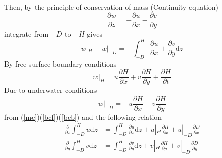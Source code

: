 \documentclass[10pt,a4paper]{article}
\newcommand{\td}{\mbox{d}}
\begin{document}
Then, by the principle of conservation of mass (Continuity equation)
\begin{equation*}
	\frac{\partial w}{\partial z}  = -\frac{\partial u}{\partial x} - \frac{\partial v}{\partial y}
\end{equation*}
integrate from $-D$ to $-H$ gives
\begin{equation}\label{mc}
	w|_H - w|_{-D}  = -\int_{-D}^{H}\frac{\partial u}{\partial x} + \frac{\partial v}{\partial y} \td z
\end{equation}
By free surface boundary conditions
\begin{equation}\label{bcf}
	w|_H  = u\frac{\partial H}{\partial x} + v\frac{\partial H}{\partial y} + \frac{\partial H}{\partial t}
\end{equation}
Due to underwater conditions
\begin{equation}\label{bcb}
	w|_{-D}  = -u\frac{\partial H}{\partial x} - v\frac{\partial H}{\partial y}
\end{equation}
from (\ref{mc})(\ref{bcf})(\ref{bcb}) and the following relation
\begin{equation*}
	\begin{aligned}
		\frac{\partial}{\partial x}\int_{-D}^{H}u\td z &= \int_{-D}^{H}\frac{\partial u}{\partial x}\td z + u|_H\frac{\partial H}{\partial x} + u|_{-D}\frac{\partial D}{\partial x}\\
		\frac{\partial}{\partial y}\int_{-D}^{H}v\td z &= \int_{-D}^{H}\frac{\partial v}{\partial y}\td z + v|_H\frac{\partial H}{\partial y} + v|_{-D}\frac{\partial D}{\partial y}
	\end{aligned}
\end{equation*}
\end{document}
